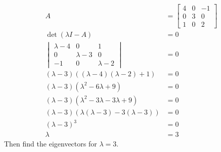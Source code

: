 \documentclass[12pt]{article}
\begin{document}
\begin{align*}
    A &=
\begin{bmatrix}
    4 & 0 & -1\\
    0 & 3 & 0\\
    1 & 0 & 2
\end{bmatrix}
\\
    \det(\lambda I - A) &= 0\\
\begin{vmatrix}
    \lambda - 4 & 0 & 1\\
    0 & \lambda - 3 & 0\\
    -1 & 0 & \lambda - 2
\end{vmatrix} &= 0
\\
    (\lambda - 3)\left((\lambda - 4)(\lambda - 2) + 1\right) &= 0\\
    (\lambda - 3)(\lambda^2 - 6\lambda + 9) &= 0\\
    (\lambda - 3)(\lambda^2 - 3\lambda - 3\lambda + 9) &= 0\\
    (\lambda - 3)(\lambda(\lambda - 3) - 3(\lambda - 3)) &= 0\\
    (\lambda - 3)^3 &= 0\\
    \lambda &= 3
\end{align*}
Then find the eigenvectors for $\lambda = 3$.
\end{document}
